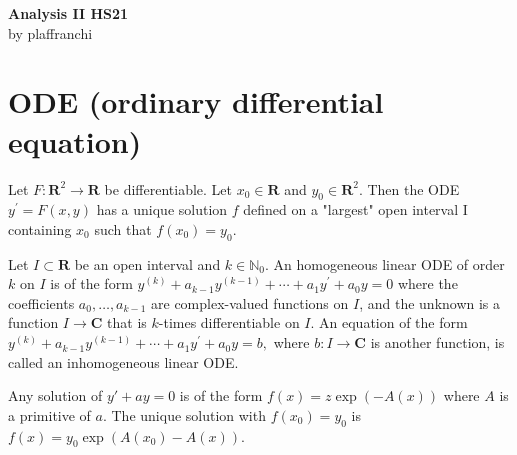 \documentclass[10pt,landscape, a4paper]{article}
\newcommand{\custombox}[3]{\begin{tcolorbox}[title = \textbf{#1}, colback=#2!10!white, colframe = #2!70!white, coltitle=white]
    #3
    \end{tcolorbox}}
\newcommand{\theorem}[2]{\custombox{Theorem #1}{red}{#2}}
\newcommand{\definition}[2]{\custombox{Definition #1}{orange}{#2}}
\newcommand{\prop}[2]{\custombox{Proposition #1}{yellow!60!orange}{#2}}
\begin{document}
\begin{multicols*}{3}
    \begin{center}
        \Large{\textbf{Analysis II HS21}} \\
        \small{by plaffranchi}
    \end{center}
    \section{ODE (ordinary differential equation)}
    \theorem{2.1.6}{Let $F: \mathbf{R}^{2} \rightarrow \mathbf{R}$ be differentiable. Let $x_{0} \in \mathbf{R}$ and $y_{0} \in \mathbf{R}^{2}$. Then the ODE
    $ y^{\prime}=F(x, y) $ has a unique solution $f$ defined on a "largest" open interval I containing $x_{0}$ such that $f\left(x_{0}\right)=y_{0} .$}
    \definition{2.2.1}{Let $I \subset \mathbf{R}$ be an open interval and $k \in \mathbb{N}_0$. An homogeneous linear ODE of order $k$ on $I$ is of the form
    $
        y^{(k)}+a_{k-1} y^{(k-1)}+\cdots+a_{1} y^{\prime}+a_{0} y=0
    $
    where the coefficients $a_{0}, \ldots, a_{k-1}$ are complex-valued functions on $I$, and the unknown is a function $I \to \mathbf{C}$ that is $k$-times differentiable on $I$.
    An equation of the form
    $
        y^{(k)}+a_{k-1} y^{(k-1)}+\cdots+a_{1} y^{\prime}+a_{0} y=b,
    $
    where $b: I \rightarrow \mathbf{C}$ is another function, is called an inhomogeneous linear ODE.}



    \prop{2.3.1}{Any solution of $y'+ay=0$ is of the form $f(x)=z\exp(-A(x))$ where $A$ is a primitive of $a$. The unique solution with $f(x_0)=y_0$ is $f(x)= y_0\exp(A(x_0)-A(x))$.}

    
\end{multicols*}
\end{document}
